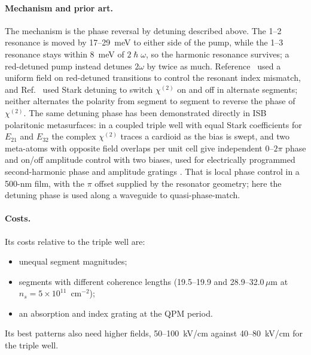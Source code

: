 \documentclass[11pt]{article}
\newcommand{\chitwo}{\chi^{(2)}}
\newcommand{\um}{\,\mu\mathrm{m}}
\begin{document}
\paragraph{Mechanism and prior art.} The mechanism is the phase reversal by detuning described above. The 1--2 resonance is moved by 17--29~meV to either side of the pump, while the 1--3 resonance stays within 8~meV of $2\hslash\omega$, so the harmonic resonance survives; a red-detuned pump instead detunes $2\omega$ by twice as much. Reference~\cite{Vurgaftman1996SSC} used a uniform field on red-detuned transitions to control the resonant index mismatch, and Ref.~\cite{Belkin2006} used Stark detuning to switch $\chitwo$ on and off in alternate segments; neither alternates the polarity from segment to segment to reverse the phase of $\chitwo$. The same detuning phase has been demonstrated directly in ISB polaritonic metasurfaces: in a coupled triple well with equal Stark coefficients for $E_{21}$ and $E_{32}$ the complex $\chitwo$ traces a cardioid as the bias is swept, and two meta-atoms with opposite field overlaps per unit cell give independent 0--$2\pi$ phase and on/off amplitude control with two biases, used for electrically programmed second-harmonic phase and amplitude gratings \cite{Yu2025}. That is local phase control in a 500-nm film, with the $\pi$ offset supplied by the resonator geometry; here the detuning phase is used along a waveguide to quasi-phase-match.

\paragraph{Costs.} Its costs relative to the triple well are:
\begin{itemize}
\item unequal segment magnitudes;
\item segments with different coherence lengths (19.5--19.9 and 28.9--32.0$\um$ at $n_s=5\times10^{11}$~cm$^{-2}$);
\item an absorption and index grating at the QPM period.
\end{itemize}
Its best patterns also need higher fields, 50--100~kV/cm against 40--80~kV/cm for the triple well.
\end{document}
